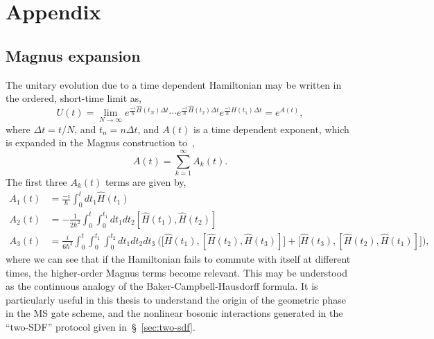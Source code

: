 \chapter{Appendix}
\minitoc

\section{Magnus expansion}
\label{app:magnus}

    The unitary evolution due to a time dependent Hamiltonian may be written in the ordered, short-time limit as,
    \begin{equation}
        U(t) = \lim_{N\rightarrow\infty} e^{\frac{-i}{\hbar}\hat H(t_N)\Delta t}\cdots e^{\frac{-i}{\hbar}\hat H(t_2)\Delta t}e^{\frac{-i}{\hbar}\hat H(t_1)\Delta t} = e^{A(t)},
    \end{equation}
    where $\Delta t = t/N$, and $t_n = n\Delta t$, and $A(t)$ is a time
    dependent exponent, which is expanded in the Magnus construction to~\cite{magnus_exponential_1954},
    \begin{equation}
        A(t) = \sum_{k=1}^{\infty} A_k(t).
    \end{equation}
    The first three $A_k(t)$ terms are given by,
    \begin{subequations}
        \label{eqn:magnus_A}
    \begin{align}
        A_1(t) &= \frac{-i}{\hbar}\int_{0}^{t}dt_1 \hat H(t_1)\\
        A_2(t) &= -\frac{1}{2\hbar^2}\int_{0}^{t}\int_{0}^{t_1}dt_1dt_2 [\hat H(t_1),\hat H(t_2)] \\
        A_3(t) &= \frac{i}{6\hbar^3}\int_{0}^{t}\int_{0}^{t_1}\int_{0}^{t_2}dt_1dt_2dt_3\ \big(\big[\hat H(t_1),\left[\hat H(t_2),\hat H(t_3)\right]\big]+\big[\hat H(t_3),\left[\hat H(t_2),\hat H(t_1)\right]\big]\big),
    \end{align}
\end{subequations}
    where we can see that if the Hamiltonian fails to commute with itself at different times, the higher-order Magnus terms become relevant.
    This may be understood as the continuous analogy of the Baker-Campbell-Hausdorff formula. It is particularly useful in this thesis to understand the origin of the geometric phase in the MS gate scheme, and the nonlinear bosonic interactions generated in the ``two-SDF'' protocol given in~\S~\ref{sec:two-sdf}.

